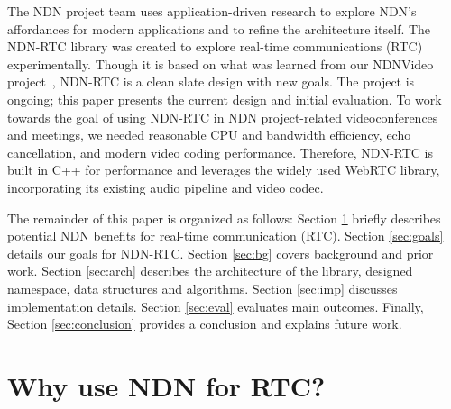 \documentclass{icn/sig-alternate-2013} %
\newcommand{\ndnrtcName}{NDN-RTC} %
\newcommand{\ndnconName}{\emph{ndncon}}
\begin{document}
The NDN project team uses application-driven research to explore NDN's affordances for modern applications and to refine the architecture itself.  %
The \ndnrtcName{} library was created to explore real-time communications (RTC) experimentally. %
Though it is based on what was learned from our NDNVideo project~\cite{ndnvideo}, \ndnrtcName{} is a clean slate design with new goals.  
The project is ongoing; this paper presents the current design and initial evaluation.  
To work towards the goal of using \ndnrtcName{} in NDN project-related videoconferences and meetings, we needed reasonable CPU and bandwidth efficiency, echo cancellation, and modern video coding performance. Therefore, \ndnrtcName{} is built in C++ for performance and leverages the widely used WebRTC library, incorporating its existing audio pipeline and video codec. 

The remainder of this paper is organized as follows: Section \ref{sec:why} briefly describes potential NDN benefits for real-time communication (RTC). Section \ref{sec:goals} details our goals for \ndnrtcName{}. Section \ref{sec:bg} covers background and prior work. Section \ref{sec:arch} describes the architecture of the library, designed namespace, data structures and algorithms. Section \ref{sec:imp} discusses implementation details. Section \ref{sec:eval} evaluates main outcomes. Finally, Section \ref{sec:conclusion} provides a conclusion and explains future work.


\section{Why use NDN for RTC?}
\label{sec:why}
\end{document}
